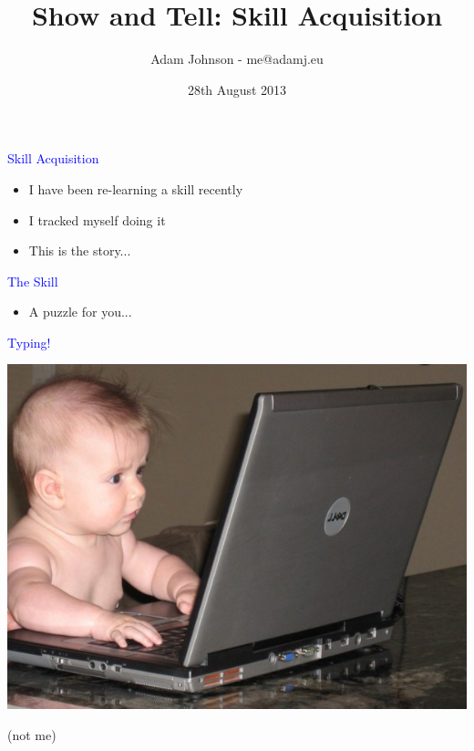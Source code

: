 \documentclass[landscape]{slides}
\title{Show and Tell: Skill Acquisition}
\author{Adam Johnson - me@adamj.eu}
\date{28th August 2013}
\begin{document}
\maketitle


\begin{slide}

    \textcolor{blue}{\Large{Skill Acquisition}}

    \begin{itemize}
        \item I have been re-learning a skill recently
        \item I tracked myself doing it
        \item This is the story...
    \end{itemize}

\end{slide}



\begin{slide}

    \textcolor{blue}{\Large{The Skill}}

    \begin{itemize}
        \item A puzzle for you...
    \end{itemize}



\end{slide}


\begin{slide}

    \textcolor{blue}{\Large{Typing!}}

    \centering

    \includegraphics[height=10cm]{baby-nerd}

    (not me)

\end{slide}
\end{document}
